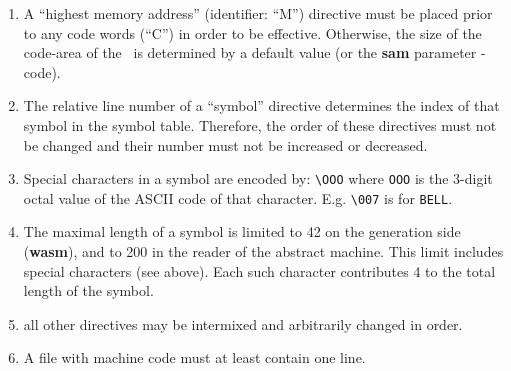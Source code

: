 \begin{enumerate}
\item
A ``highest memory address'' (identifier: ``M'')
directive must be placed prior to any code words (``C'') in order
to be effective. Otherwise, the size of the code-area of the \SAM\ is
determined by a default value (or the {\bf sam} parameter -code).
\item
The relative line number of a ``symbol'' directive determines the index
of that symbol in the symbol table. Therefore, the order of these
directives must not be changed and their number must not be 
increased or decreased.
\item
Special characters in a symbol are encoded by: \verb+\OOO+
where {\tt OOO} is the 3-digit octal value of the ASCII code of that
character. E.g. \verb+\007+ is for {\tt BELL}.
\item
The maximal length of a symbol is limited to 42 on the 
generation side ({\bf wasm}), and to 200 in the reader of
the abstract machine.
This limit includes special characters (see above). Each such character
contributes 4 to the total length of the symbol.
\item
all other directives may be intermixed and arbitrarily changed in order.
\item
A file with machine code must at least contain one line.
\end{enumerate}

